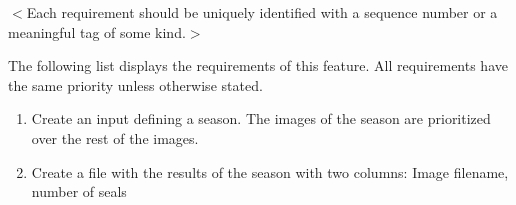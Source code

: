 \documentclass{scrreprt}
\begin{document}
$<$Each requirement should be uniquely identified with a sequence number or a 
meaningful tag of some kind.$>$
\fi

The following list displays the requirements of this feature. All requirements
have the same priority unless otherwise stated. 


\begin{enumerate}[REQ-1:]
	\item Create an input defining a season. The images of the season are prioritized
	over the rest of the images.
	\item Create a file with the results of the season with two columns: Image 
	filename, number of seals
\end{enumerate}







\end{document}
